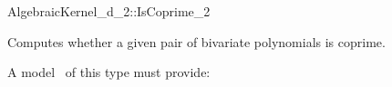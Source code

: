 \begin{ccRefConcept}{AlgebraicKernel_d_2::IsCoprime_2}

\ccDefinition
Computes whether a given pair of bivariate polynomials is coprime. 
 
\ccRefines 
{} 

\ccOperations
{}

A model \ccVar\ of this type must provide:

{}

\ccSeeAlso

\end{ccRefConcept}
